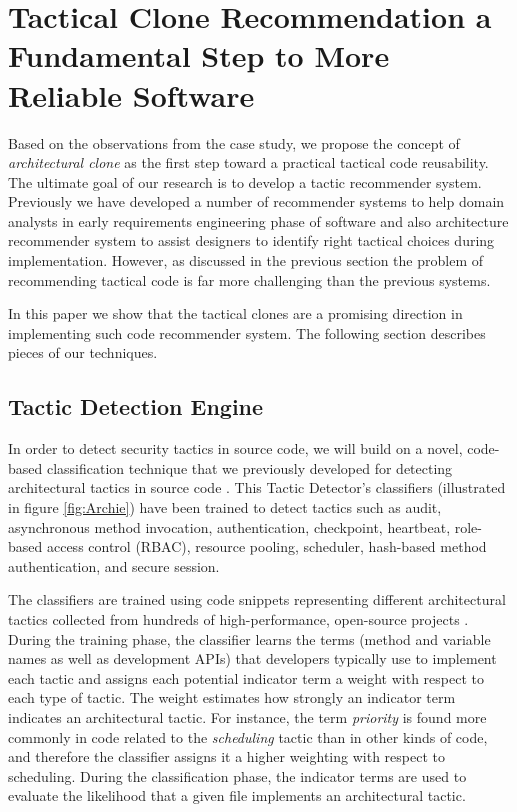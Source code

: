 
\section{Tactical Clone Recommendation a Fundamental Step to More Reliable Software}
Based on the observations from the case study, we propose the concept of \emph{architectural clone} as the first step toward a practical tactical code reusability. The ultimate goal of our research is to develop a tactic recommender system. Previously we have developed a number of recommender systems to help domain analysts in early requirements engineering phase of software and also architecture recommender system to assist designers to identify right tactical choices during implementation. However, as discussed in the previous section the problem of recommending tactical code is far more challenging than the previous systems.

In this paper we show that the tactical clones are a promising direction in implementing such code recommender system.  The following section describes pieces of our techniques.

\subsection{Tactic Detection Engine}

In order to detect security tactics in source code, we will build on a novel, code-based classification technique that we previously developed for detecting architectural tactics in  source code \cite{Dissertation}. This Tactic Detector's classifiers (illustrated in figure \ref{fig:Archie}) have been trained to detect tactics such as audit, asynchronous method invocation, authentication, checkpoint, heartbeat, role-based access control (RBAC), resource pooling, scheduler, hash-based method authentication, and secure session.




 The classifiers are trained using code snippets representing different architectural tactics collected from hundreds of high-performance, open-source projects \cite{FSE2012,ICSE2012,Dissertation}.  During the training phase, the classifier learns the terms (method and variable names as well as development APIs) that developers typically use to implement each  tactic and assigns each potential indicator term a weight with respect to each type of  tactic. The weight estimates how strongly an indicator term indicates an architectural tactic. For instance, the term \emph{priority} is found more commonly in code related to the \emph{scheduling} tactic than in other kinds of code, and therefore the classifier assigns it a higher weighting with respect to scheduling. During the classification phase, the indicator terms are used to evaluate the likelihood that a given file implements an architectural tactic.
 
